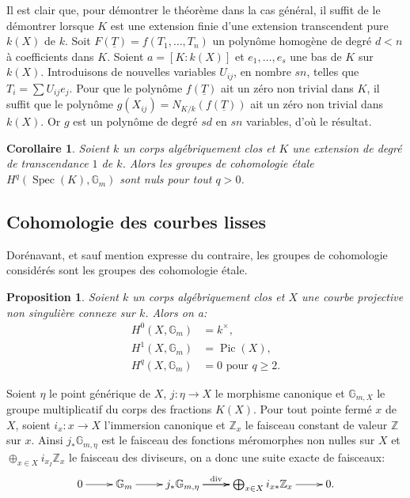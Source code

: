 \documentclass{article}
\DeclareMathOperator{\dv}{div}
\DeclareMathOperator{\pic}{Pic}
\DeclareMathOperator{\spec}{Spec}
\newcommand{\dG}{\mathbb{G}}
\newcommand{\dZ}{\mathbb{Z}}
\newtheorem{proposition}[subsubsection]{Proposition}
\newtheorem{corollary}[subsubsection]{Corollaire}
\begin{document}
Il est clair que, pour démontrer le théorème dans la cas général, il 
suffit de le démontrer lorsque $K$ est une extension finie d'une extension 
transcendent pure $k(X)$ de $k$. Soit $F(\underline T)=f(T_1,\dotsc,T_n)$ un 
polynôme homogène de degré $d<n$ à coefficients dans $K$. Soient 
$a=[K:k(X)]$ et $e_1,\dotsc,e_s$ une bas de $K$ sur $k(X)$. Introduisons de 
nouvelles variables $U_{i j}$, en nombre $s n$, telles que 
$T_i=\sum U_{i j}e_j$. Pour que le polynôme $f(\underline T)$ ait un zéro 
non trivial dans $K$, il suffit que le polynôme 
$g(X_{i j}) = N_{K/k}(f(\underline T))$ ait un zéro non trivial dans $k(X)$. 
Or $g$ est un polynôme de degré $s d$ en $s n$ variables, d'où le 
résultat. 





\begin{corollary}\label{3-2-4}
  Soient $k$ un corps algébriquement clos et $K$ une extension de degré 
de transcendance $1$ de $k$. Alors les groupes de cohomologie étale 
$H^q(\spec(K),\dG_m)$ sont nuls pour tout $q>0$. 
\end{corollary}










\subsection{Cohomologie des courbes lisses}

Dorénavant, et sauf mention expresse du contraire, les groupes de 
cohomologie considérés sont les groupes des cohomologie étale. 





\begin{proposition}\label{3-3-1}
Soient $k$ un corps algébriquement clos et $X$ une courbe projective non 
singulière connexe sur $k$. Alors on a:
\begin{align*}
  H^0(X,\dG_m) &= k^\times \text{,} \\
  H^1(X,\dG_m) &= \pic(X) \text{,} \\
  H^q(X,\dG_m) &= 0 \text{ pour $q\geqslant 2$.}
\end{align*}
\end{proposition}

Soient $\eta$ le point générique de $X$, $j:\eta\to X$ le morphisme 
canonique et $\dG_{m,X}$ le groupe multiplicatif du corps des fractions 
$K(X)$. Pour tout pointe fermé $x$ de $X$, soient $i_x:x\to X$ l'immersion 
canonique et $\dZ_x$ le faisceau constant de valeur $\dZ$ sur $x$. Ainsi 
$j_*\dG_{m,\eta}$ est le faisceau des fonctions méromorphes non nulles sur 
$X$ et $\oplus_{x\in X} i_{x_I}\dZ_x$ le faisceau des diviseurs, on a donc une 
suite exacte de faisceaux:
\begin{equation}\label{eq:2}
\xymatrix{
  0 \ar[r] 
    & \dG_m \ar[r]
    & j_* \dG_{m,\eta} \ar[r]^-{\dv} \ar[r] 
    & \bigoplus_{x\in X} i_{x*} \dZ_x \ar[r] 
    & 0\text{.}
}
\end{equation}
\end{document}
